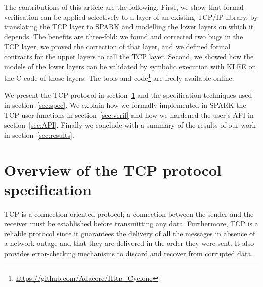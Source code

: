 \documentclass[conference]{IEEEtran}
\begin{document}
The contributions of this article are the following. First, we show that formal verification can be applied selectively to a layer of an existing TCP/IP library, by translating the TCP layer to SPARK and modelling the lower layers on which it depends. The benefits are three-fold: we found and corrected two bugs in the TCP layer, we proved the correction of that layer, and we defined formal contracts for the upper layers to call the TCP layer. Second, we showed how the models of the lower layers can be validated by symbolic execution with KLEE on the C code of those layers. The tools and code\footnote{\url{https://github.com/Adacore/Http_Cyclone}} are freely available online.

We present the TCP protocol in section~\ref{sec:TCP} and the specification
techniques used in section~\ref{sec:spec}. We explain how we formally
implemented in SPARK the TCP user functions in section~\ref{sec:verif} and how
we hardened the user's API in section~\ref{sec:API}. Finally we conclude with a
summary of the results of our work in section~\ref{sec:results}.

\section{Overview of the TCP protocol specification}
\label{sec:TCP}



TCP is a connection-oriented protocol; a connection between the sender and the receiver must be established before transmitting any data. Furthermore, TCP is a reliable protocol since it guarantees the delivery of all the messages in absence of a network outage and that they are delivered in the order they were sent. It also provides error-checking mechanisms to discard and recover from corrupted data.

\end{document}
